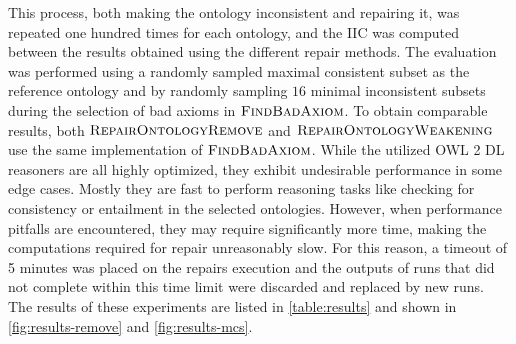 This process, both making the ontology inconsistent and repairing it, was repeated one hundred times for each ontology, and the IIC was computed between the results obtained using the different repair methods. The evaluation was performed using a randomly sampled maximal consistent subset as the reference ontology and by randomly sampling $16$ minimal inconsistent subsets during the selection of bad axioms in $\textsc{FindBadAxiom}$. To obtain comparable results, both $\textsc{RepairOntologyRemove}$ and $\textsc{RepairOntologyWeakening}$ use the same implementation of $\textsc{FindBadAxiom}$. While the utilized OWL 2 DL reasoners are all highly optimized, they exhibit undesirable performance in some edge cases. Mostly they are fast to perform reasoning tasks like checking for consistency or entailment in the selected ontologies. However, when performance pitfalls are encountered, they may require significantly more time, making the computations required for repair unreasonably slow. For this reason, a timeout of 5 minutes was placed on the repairs execution and the outputs of runs that did not complete within this time limit were discarded and replaced by new runs. The results of these experiments are listed in \cref{table:results} and shown in \cref{fig:results-remove} and \cref{fig:results-mcs}.

